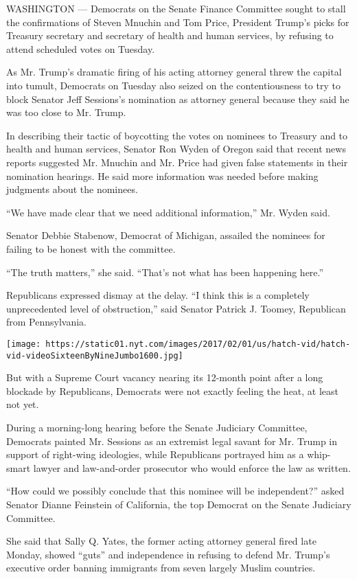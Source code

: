WASHINGTON --- Democrats on the Senate Finance Committee sought to stall
the confirmations of Steven Mnuchin and Tom Price, President Trump's
picks for Treasury secretary and secretary of health and human services,
by refusing to attend scheduled votes on Tuesday.

As Mr. Trump's dramatic firing of his acting attorney general threw the
capital into tumult, Democrats on Tuesday also seized on the
contentiousness to try to block Senator Jeff Sessions's nomination as
attorney general because they said he was too close to Mr. Trump.

In describing their tactic of boycotting the votes on nominees to
Treasury and to health and human services, Senator Ron Wyden of Oregon
said that recent news reports suggested Mr. Mnuchin and Mr. Price had
given false statements in their nomination hearings. He said more
information was needed before making judgments about the nominees.

``We have made clear that we need additional information,'' Mr. Wyden
said.

Senator Debbie Stabenow, Democrat of Michigan, assailed the nominees for
failing to be honest with the committee.

``The truth matters,'' she said. ``That's not what has been happening
here.''

Republicans expressed dismay at the delay. ``I think this is a
completely unprecedented level of obstruction,'' said Senator Patrick J.
Toomey, Republican from Pennsylvania.

\texttt{[image: https://static01.nyt.com/images/2017/02/01/us/hatch-vid/hatch-vid-videoSixteenByNineJumbo1600.jpg]}

But with a Supreme Court vacancy nearing its 12-month point after a long
blockade by Republicans, Democrats were not exactly feeling the heat, at
least not yet.

During a morning-long hearing before the Senate Judiciary Committee,
Democrats painted Mr. Sessions as an extremist legal savant for Mr.
Trump in support of right-wing ideologies, while Republicans portrayed
him as a whip-smart lawyer and law-and-order prosecutor who would
enforce the law as written.

``How could we possibly conclude that this nominee will be
independent?'' asked Senator Dianne Feinstein of California, the top
Democrat on the Senate Judiciary Committee.

She said that Sally Q. Yates, the former acting attorney general fired
late Monday, showed ``guts'' and independence in refusing to defend Mr.
Trump's executive order banning immigrants from seven largely Muslim
countries.

